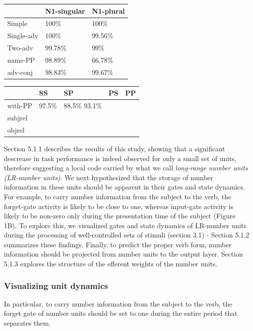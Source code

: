 \begin{tabular}{ |p{3cm}||p{3cm}|p{3cm}|}
 \hline
 & N1-singular & N1-plural \\
 \hline
 \hline
 Simple & 100\% & 100\% \\
 Single-adv & 100\% & 99.56\% \\
 Two-adv & 99.78\% & 99\% \\
 name-PP & 98.89\% & 66.78\% \\
 adv-conj & 98.83\% & 99.67\% \\ 
 \hline
\end{tabular}

\begin{tabular}{ |p{3cm}||p{3cm}|p{3cm}|p{3cm}|p{3cm}|}
 \hline
 & SS & SP & PS & PP\\
\hline
\hline
 with-PP & 97.5\% & 88.5\% 93.1\% & &  \\
 subjrel & & & & \\
 objrel & & & & \\
 \hline
\end{tabular}



Section 5.1.1 describes the results of this study, showing that a significant descrease in task performance is indeed observed for only a small set of units, therefore suggesting a local code carried by what we call \textit{long-range number units (LR-number units)}. We next hypothesized that the storage of number information in these units should be apparent in their gates and state dynamics. For example, to carry number information from the subject to the verb, the forget-gate activity is likely to be close to one, whereas input-gate activity is likely to be non-zero only during the presentation time of the subject (Figure 1B). To explore this, we visualized gates and state dynamics of LR-number units during the processing of well-controlled sets of stimuli (section 3.1) - Section 5.1.2 summarizes these findings. Finally, to predict the proper verb form, number information should be projected from number units to the output layer. Section 5.1.3 explores the structure of the efferent weights of the number units. 



\subsubsection{Visualizing unit dynamics}
In particular, to carry number information from the subject to the verb, the forget gate of number units should be set to one during the entire period that separates them. 


